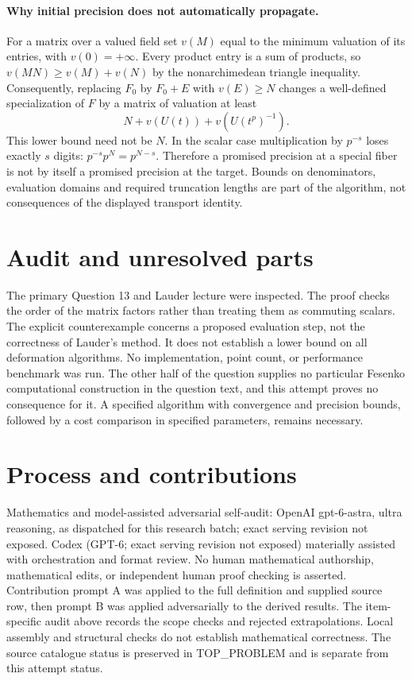 \documentclass[11pt]{article}
\begin{document}
\paragraph{Why initial precision does not automatically propagate.}
For a matrix over a valued field set $v(M)$ equal to the minimum
valuation of its entries, with $v(0)=+\infty$. Every product entry
is a sum of products, so $v(MN)\ge v(M)+v(N)$ by the
nonarchimedean triangle inequality. Consequently, replacing $F_0$ by
$F_0+E$ with $v(E)\ge N$ changes a well-defined specialization of
$F$ by a matrix of valuation at least
\[
N+v(U(t))+v(U(t^p)^{-1}).
\]
This lower bound need not be $N$. In the scalar case multiplication
by $p^{-s}$ loses exactly $s$ digits: $p^{-s}p^N=p^{N-s}$.
Therefore a promised precision at a special fiber is not by itself
a promised precision at the target. Bounds on denominators, evaluation
domains and required truncation lengths are part of the algorithm,
not consequences of the displayed transport identity.

\section{Audit and unresolved parts}
The primary Question 13 and Lauder lecture were inspected. The proof
checks the order of the matrix factors rather than treating them as
commuting scalars. The explicit counterexample concerns a proposed
evaluation step, not the correctness of Lauder's method. It does not
establish a lower bound on all deformation algorithms. No implementation,
point count, or performance benchmark was run. The other half of the
question supplies no particular Fesenko computational construction in
the question text, and this attempt proves no consequence for it.
A specified algorithm with convergence and precision bounds, followed
by a cost comparison in specified parameters, remains necessary.

\section{Process and contributions}
Mathematics and model-assisted adversarial self-audit: OpenAI gpt-6-astra, ultra reasoning, as dispatched for this research batch; exact serving revision not exposed. Codex (GPT-6; exact serving revision not exposed) materially assisted with orchestration and format review. No human mathematical authorship, mathematical edits, or independent human proof checking is asserted.
Contribution prompt A was applied to the full definition and supplied source row, then prompt B was applied adversarially to the derived results. The item-specific audit above records the scope checks and rejected extrapolations. Local assembly and structural checks do not establish mathematical correctness. The source catalogue status is preserved in TOP\_PROBLEM and is separate from this attempt status.
\end{document}
